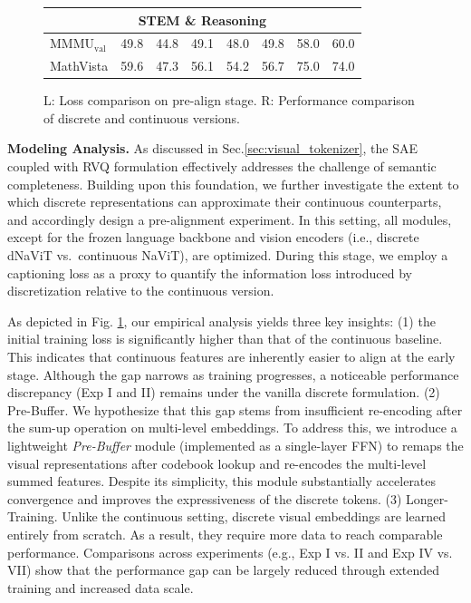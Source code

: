 \begin{figure}[t]
\begin{minipage}[c]{0.6\textwidth}
\begin{tabular}{l|ccccc|cc}
        \midrule
        \multicolumn{8}{c}{\textbf{STEM \& Reasoning}} \\
        \midrule
        MMMU$_{\text{val}}$ & 49.8 & 44.8 & 49.1 & 48.0 & 49.8 & 58.0 & 60.0 \\
        MathVista & 59.6 & 47.3 & 56.1 & 54.2 & 56.7 & 75.0 & 74.0 \\
        \bottomrule
        \end{tabular}
    \end{minipage}
    \vspace{1em}
    \caption{L: Loss comparison on pre-align stage. R: Performance comparison of discrete and continuous versions.}
    \label{fig_tab:combined_optimized_layout}
    \vspace{-5pt}
\end{figure}

\textbf{Modeling Analysis.} As discussed in Sec.\ref{sec:visual_tokenizer}, the SAE coupled with RVQ formulation effectively addresses the challenge of semantic completeness. Building upon this foundation, we further investigate the extent to which discrete representations can approximate their continuous counterparts, and accordingly design a pre-alignment experiment. In this setting, all modules, except for the frozen language backbone and vision encoders (i.e., discrete dNaViT vs.\ continuous NaViT), are optimized. During this stage, we employ a captioning loss as a proxy to quantify the information loss introduced by discretization relative to the continuous version.

As depicted in Fig. \ref{fig_tab:combined_optimized_layout}, our empirical analysis yields three key insights: 
(1) the initial training loss is significantly higher than that of the continuous baseline. This indicates that continuous features are inherently easier to align at the early stage. Although the gap narrows as training progresses, a noticeable performance discrepancy (Exp I and II) remains under the vanilla discrete formulation. 
(2) Pre-Buffer. We hypothesize that this gap stems from insufficient re-encoding after the sum-up operation on multi-level embeddings. To address this, we introduce a lightweight \textit{Pre-Buffer} module (implemented as a single-layer FFN) to remaps the visual representations after codebook lookup and re-encodes the multi-level summed features. Despite its simplicity, this module substantially accelerates convergence and improves the expressiveness of the discrete tokens.
(3) Longer-Training. Unlike the continuous setting, discrete visual embeddings are learned entirely from scratch. As a result, they require more data to reach comparable performance. Comparisons across experiments (e.g., Exp I vs. II and Exp IV vs. VII) show that the performance gap can be largely reduced through extended training and increased data scale.


